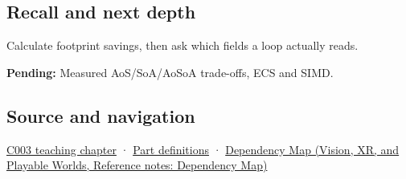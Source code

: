 \subsection{Recall and next depth}\label{appendix-5522ad176ca0-recall-and-next-depth}

Calculate footprint savings, then ask which fields a loop actually reads.

\textbf{Pending:} Measured AoS/SoA/AoSoA trade-offs, ECS and SIMD.

\subsection{Source and navigation}\label{appendix-5522ad176ca0-source-and-navigation}

\hyperref[01-foundations-i-ch002-where-the-bytes-live]{C003 teaching chapter} · \hyperref[appendix-fd090d982a15-m003---parts-41-60]{Part definitions} · \href{../07-Vision-XR-and-Playable-Worlds/main.pdf\#nameddest=appendix-4ad47bdd269a}{Dependency Map (Vision, XR, and Playable Worlds, Reference notes: Dependency Map)}
